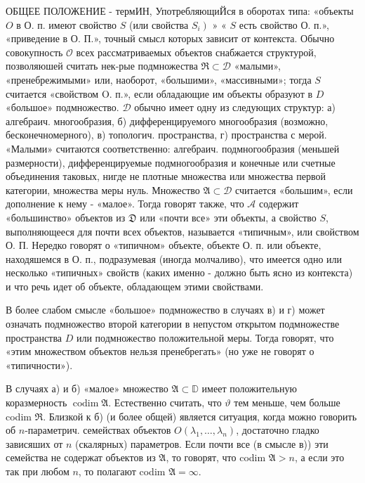 \documentclass[10pt]{article}
\begin{document}
ОБЩЕЕ ПОЛОЖЕНИЕ - термИН, УпотребляющиЙся в оборотах типа: «объекты $O$ в О. п. имеют свойство $S$ (или свойства $\left.S_{i}\right)$ » « $S$ есть свойство О. п.», «приведение в О. П.», точный смысл которых зависит от контекста. Обычно совокупность $\mathscr{O}$ всех рассматриваемых объектов снабжается структурой, позволяюшей считать нек-рые подмножества $\Re \subset \mathcal{D}$ «малыми», «пренебрежимыми» или, наоборот, «большими», «массивными»; тогда $S$ считается «свойством O. п.», если обладающие им объекты образуют в $D$ «большое» подмножество. $\mathcal{D}$ обычно имеет одну из следующих структур: а) алгебраич. многообразия, б) дифференцируемого многообразия (возможно, бесконечномерного), в) топологич. пространства, г) пространства с мерой. «Малыми» считаются соответственно: алгебраич. подмногообразия (меньшей размерности), дифференцируемые подмногообразия и конечные или счетные объединения таковых, нигде не плотные множества или множества первой категории, множества меры нуль. Множество $\mathfrak{A} \subset \mathcal{D}$ считается «большим», если дополнение к нему - «малое». Тогда говорят также, что $\mathscr{A}$ содержит «большинство» объектов из $\mathfrak{D}$ или «почти все» эти объекты, а свойство $S$, выполняющееся для почти всех объектов, называется «типичным», или свойством О. П. Нередко говорят о «типичном» объекте, объекте О. п. или объекте, находяшемся в О. п., подразумевая (иногда молчаливо), что имеется одно или несколько «типичных» свойств (каких именно - должно быть ясно из контекста) и что речь идет об объекте, обладающем этими свойствами.



В более слабом смысле «большое» подмножество в случаях в) и г) может означать подмножество второй категории в непустом открытом подмножестве пространства $D$ или подмножество положительной меры. Тогда говорят, что «этим множеством объектов нельзя пренебрегать» (но уже не говорят о «типичности»).



В случаях а) и б) «малое» множество $\mathfrak{A} \subset \mathbb{D}$ имеет положительную коразмерность $\operatorname{codim} \mathfrak{A}$. Естественно считать, что $\mathfrak{\vartheta}$ тем меньше, чем больше codim $\Re$. Близкой к б) (и более общей) является ситуация, когда можно говорить об $n$-параметрич. семействах объектов $O\left(\lambda_{1}, \ldots, \lambda_{n}\right)$, достаточно гладко зависяших от $n$ (скалярных) параметров. Если почти все (в смысле в)) эти семейства не содержат объектов из $\mathfrak{A}$, то говорят, что codim $\mathfrak{A}>n$, а если это так при любом $n$, то полагают codim $\mathfrak{A}=\infty$.
\end{document}
